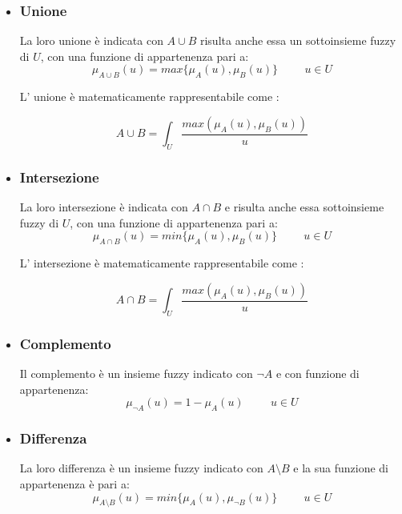 \documentclass[a4paper,12pt]{report}
\begin{document}
\begin{itemize}
    \item \subsubsection{Unione}
La loro unione è indicata con $A \cup B$ risulta anche essa un sottoinsieme fuzzy di $U$, con una funzione di appartenenza pari a:
\begin{equation*}
    \mu_{A\cup B} (u) = max\{\mu_A(u),\mu_B(u)\} \hspace{1cm}  u\in U
\end{equation*}

L' unione è matematicamente rappresentabile come :

\begin{equation*}
    A \cup B = \int_{U} \frac{max(\mu_A(u),\mu_B(u))}{u}
\end{equation*}

\item \subsubsection{Intersezione}
La loro intersezione è indicata con $A \cap B$ e risulta anche essa sottoinsieme fuzzy di $U$, con una funzione di appartenenza pari a:
\begin{equation*}
    \mu_{A \cap B} (u) = min\{\mu_A(u),\mu_B(u)\} \hspace{1cm}  u\in U
\end{equation*}

L' intersezione è matematicamente rappresentabile come :

\begin{equation*}
    A \cap B = \int_{U} \frac{max(\mu_A(u),\mu_B(u))}{u}
\end{equation*}

\item \subsubsection{Complemento}
Il complemento è un insieme fuzzy indicato con $\neg A$ e con funzione di appartenenza:
\begin{equation*}
    \mu_{\neg A}(u) = 1 - \mu_A(u) \hspace{1cm}  u\in U
\end{equation*}

\item \subsubsection{Differenza}
La loro differenza è un insieme fuzzy indicato con $A \setminus B$ e la sua funzione di appartenenza è pari a:
\begin{equation*}
    \mu_{A \setminus B} (u) = min\{\mu_A(u),\mu_{\neg B}(u)\} \hspace{1cm}  u\in U
\end{equation*}


\end{itemize}
\end{document}
